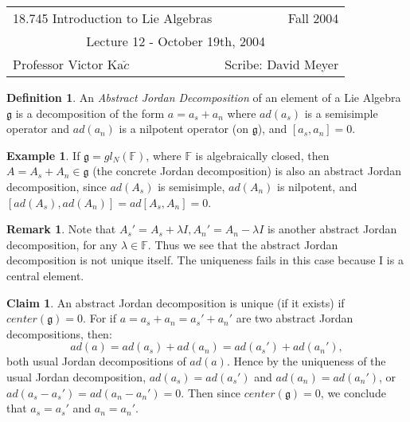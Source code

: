 \documentclass[12pt]{amsart}
\theoremstyle{definition}
\newtheorem*{defn}{Definition}
\theoremstyle{definition}
\theoremstyle{definition}
\newtheorem*{rem}{Remark}
\newtheorem*{example}{Example}
\numberwithin{equation}{subsection}
\newtheorem*{claim}{Claim}
\newcommand{\g}{\mathfrak{g}}
\begin{document}
\begin{center}
\begin{tabular}{|lr|}
\hline
18.745 Introduction to Lie Algebras&Fall 2004\\
\multicolumn{2}{|c|}{Lecture 12 - October 19th, 2004}\\
Professor Victor Ka$\breve{c}$&Scribe: David Meyer\\
\hline
\end{tabular}
\end{center}




\setcounter{section}{0}


\begin{defn}
An \emph{Abstract Jordan Decomposition} of an element of a Lie Algebra $\g$
is a decomposition of the form $a = a_s + a_n$ where $ad(a_s)$ is a semisimple operator and $ad(a_n)$
is a nilpotent operator (on $\g$), and $[a_s, a_n] = 0$.
\end{defn}

\begin{example}
If $\g = gl_N(\mathbb{F})$, where $\mathbb{F}$ is algebraically closed, then
$A = A_s + A_n \in \g$ (the concrete Jordan decomposition) is also an abstract Jordan decomposition,
since $ad(A_s)$ is semisimple, $ad(A_n)$ is nilpotent, and $[ad(A_s), ad(A_n)] = ad[A_s,A_n] = 0$.
\end{example}

\begin{rem}
Note that $A_s' = A_s + \lambda{}I, A_n' = A_n - \lambda{}I$ is another abstract Jordan decomposition, for
any $\lambda \in \mathbb{F}$. Thus we see that the abstract Jordan decomposition is not unique itself. The uniqueness
fails in this case because I is a central element.
\end{rem}

\begin{claim}
An abstract Jordan decomposition is unique (if it exists) if $center(\g) = 0$. For if
$a = a_s + a_n = a_s' + a_n'$ are two abstract Jordan decompositions, then:
$$ad(a) = ad(a_s) + ad(a_n) = ad(a_s') + ad(a_n'),$$
both usual Jordan decompositions of $ad(a)$. Hence by the uniqueness of the usual Jordan
decomposition, $ad(a_s) = ad(a_s')$ and $ad(a_n) = ad(a_n')$, or \mbox{$ad(a_s - a_s') = ad(a_n - a_n') = 0$}.
Then since $center(\g) = 0$, we conclude that $a_s = a_s'$ and $a_n = a_n'$. 
\end{claim}
\end{document}
